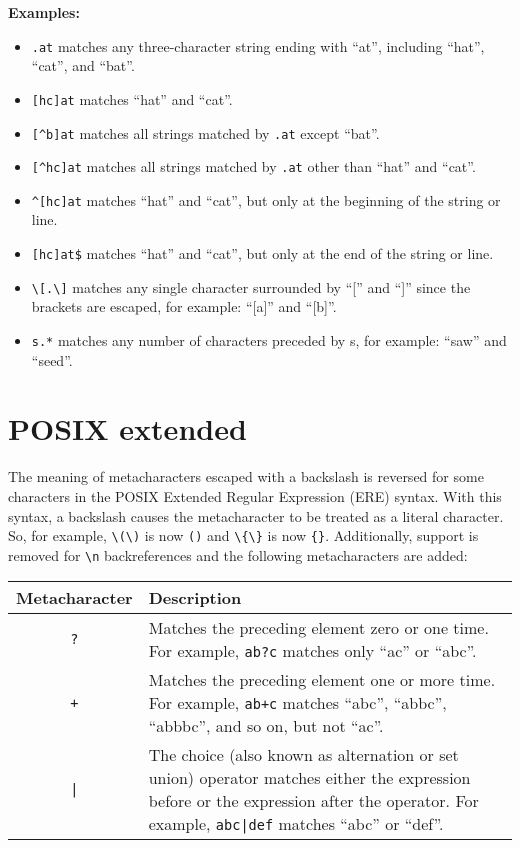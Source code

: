 \textbf{Examples:}
\begin{itemize}
\item \verb|.at| matches any three-character string ending with ``at'',
  including ``hat'', ``cat'', and ``bat''.
\item \verb|[hc]at| matches ``hat'' and ``cat''.
\item \verb|[^b]at| matches all strings matched by \verb|.at| except ``bat''.
\item \verb|[^hc]at| matches all strings matched by \verb|.at| other than
  ``hat'' and ``cat''.
\item \verb|^[hc]at| matches ``hat'' and ``cat'', but only at the beginning
  of the string or line.
\item \verb|[hc]at$| matches ``hat'' and ``cat'', but only at the end of
  the string or line.
\item \verb|\[.\]| matches any single character surrounded by ``['' and ``]''
  since the brackets are escaped, for example: ``[a]'' and ``[b]''.
\item \verb|s.*| matches any number of characters preceded by s, for example:
  ``saw'' and ``seed''.
\end{itemize}

\section{POSIX extended}
The meaning of metacharacters escaped with a backslash is reversed for some
characters in the POSIX Extended Regular Expression (ERE) syntax. With this
syntax, a backslash causes the metacharacter to be treated as a literal
character. So, for example, \verb|\(\)| is now \verb|()| and \verb|\{\}| is
now \verb|{}|. Additionally, support is removed for \verb|\n| backreferences
and the following metacharacters are added:
\begin{tabularx}{\textwidth}{|c|X|}
  \hline
  \textbf{Metacharacter} & \textbf{Description} \\ \hline
  \verb|?| & Matches the preceding element zero or one time. For example, 
  \verb|ab?c| matches only ``ac'' or ``abc''.\\ \hline
  \verb|+| & Matches the preceding element one or more time. For example,
  \verb|ab+c| matches ``abc'', ``abbc'', ``abbbc'', and so on, but not
  ``ac''.\\ \hline
  \verb/|/ & The choice (also known as alternation or set union) operator
  matches either the expression before or the expression after the operator.
  For example, \verb/abc|def/ matches ``abc'' or ``def''.\\
  \hline
\end{tabularx}

